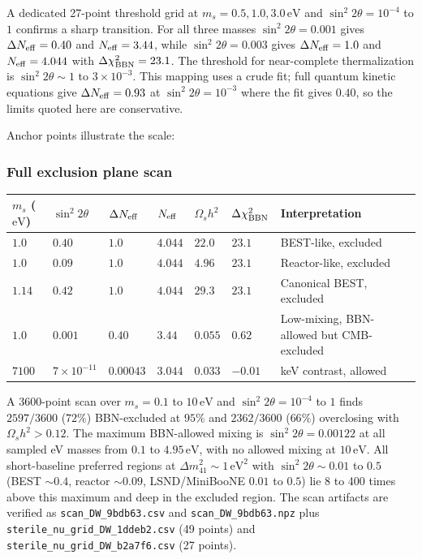 \documentclass[11pt,a4paper]{article}
\begin{document}
A dedicated 27-point threshold grid at $m_s = 0.5, 1.0, 3.0\,\mathrm{eV}$ and $\sin^2 2\theta = 10^{-4}$ to $1$ confirms a sharp transition. For all three masses $\sin^2 2\theta = 0.001$ gives $\Delta N_{\rm eff} = 0.40$ and $N_{\rm eff} = 3.44$, while $\sin^2 2\theta = 0.003$ gives $\Delta N_{\rm eff} = 1.0$ and $N_{\rm eff} = 4.044$ with $\Delta\chi^2_{\rm BBN} = 23.1$. The threshold for near-complete thermalization is $\sin^2 2\theta \sim 1$ to $3 \times 10^{-3}$. This mapping uses a crude fit; full quantum kinetic equations give $\Delta N_{\rm eff} = 0.93$ at $\sin^2 2\theta = 10^{-3}$ where the fit gives $0.40$, so the limits quoted here are conservative.

Anchor points illustrate the scale:

\subsubsection{Full exclusion plane scan}
\begin{longtable}{@{}p{}p{}p{}p{}p{}p{}p{}@{}}
\toprule
\textbf{$m_s$ ($\mathrm{eV}$)} & \textbf{$\sin^2 2\theta$} & \textbf{$\Delta N_{\rm eff}$} & \textbf{$N_{\rm eff}$} & \textbf{$\Omega_s h^2$} & \textbf{$\Delta\chi^2_{\rm BBN}$} & \textbf{Interpretation} \\ \midrule \endhead
$1.0$ & $0.40$ & $1.0$ & $4.044$ & $22.0$ & $23.1$ & BEST-like, excluded \\
$1.0$ & $0.09$ & $1.0$ & $4.044$ & $4.96$ & $23.1$ & Reactor-like, excluded \\
$1.14$ & $0.42$ & $1.0$ & $4.044$ & $29.3$ & $23.1$ & Canonical BEST, excluded \\
$1.0$ & $0.001$ & $0.40$ & $3.44$ & $0.055$ & $0.62$ & Low-mixing, BBN-allowed but CMB-excluded \\
$7100$ & $7\times10^{-11}$ & $0.00043$ & $3.044$ & $0.033$ & $-0.01$ & keV contrast, allowed \\
\bottomrule\end{longtable}
A 3600-point scan over $m_s = 0.1$ to $10\,\mathrm{eV}$ and $\sin^2 2\theta = 10^{-4}$ to $1$ finds $2597/3600$ ($72\%$) BBN-excluded at $95\%$ and $2362/3600$ ($66\%$) overclosing with $\Omega_s h^2 > 0.12$. The maximum BBN-allowed mixing is $\sin^2 2\theta = 0.00122$ at all sampled eV masses from $0.1$ to $4.95\,\mathrm{eV}$, with no allowed mixing at $10\,\mathrm{eV}$. All short-baseline preferred regions at $\Delta m^2_{41} \sim 1\,\mathrm{eV}^2$ with $\sin^2 2\theta \sim 0.01$ to $0.5$ (BEST $\sim 0.4$, reactor $\sim 0.09$, LSND/MiniBooNE $0.01$ to $0.5$) lie 8 to 400 times above this maximum and deep in the excluded region. The scan artifacts are verified as \texttt{scan\_\allowbreak{}DW\_\allowbreak{}9bdb63.csv} and \texttt{scan\_\allowbreak{}DW\_\allowbreak{}9bdb63.npz} plus \texttt{sterile\_\allowbreak{}nu\_\allowbreak{}grid\_\allowbreak{}DW\_\allowbreak{}1ddeb2.csv} (49 points) and \texttt{sterile\_\allowbreak{}nu\_\allowbreak{}grid\_\allowbreak{}DW\_\allowbreak{}b2a7f6.csv} (27 points).
\end{document}
